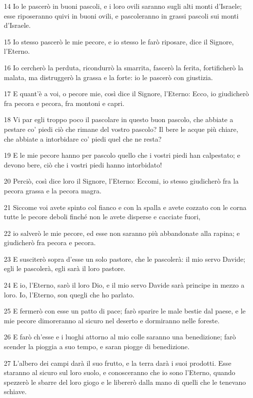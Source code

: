 \par 14 Io le pascerò in buoni pascoli, e i loro ovili saranno sugli alti monti d'Israele; esse riposeranno quivi in buoni ovili, e pascoleranno in grassi pascoli sui monti d'Israele.
\par 15 Io stesso pascerò le mie pecore, e io stesso le farò riposare, dice il Signore, l'Eterno.
\par 16 Io cercherò la perduta, ricondurrò la smarrita, fascerò la ferita, fortificherò la malata, ma distruggerò la grassa e la forte: io le pascerò con giustizia.
\par 17 E quant'è a voi, o pecore mie, così dice il Signore, l'Eterno: Ecco, io giudicherò fra pecora e pecora, fra montoni e capri.
\par 18 Vi par egli troppo poco il pascolare in questo buon pascolo, che abbiate a pestare co' piedi ciò che rimane del vostro pascolo? Il bere le acque più chiare, che abbiate a intorbidare co' piedi quel che ne resta?
\par 19 E le mie pecore hanno per pascolo quello che i vostri piedi han calpestato; e devono bere, ciò che i vostri piedi hanno intorbidato!
\par 20 Perciò, così dice loro il Signore, l'Eterno: Eccomi, io stesso giudicherò fra la pecora grassa e la pecora magra.
\par 21 Siccome voi avete spinto col fianco e con la spalla e avete cozzato con le corna tutte le pecore deboli finché non le avete disperse e cacciate fuori,
\par 22 io salverò le mie pecore, ed esse non saranno più abbandonate alla rapina; e giudicherò fra pecora e pecora.
\par 23 E susciterò sopra d'esse un solo pastore, che le pascolerà: il mio servo Davide; egli le pascolerà, egli sarà il loro pastore.
\par 24 E io, l'Eterno, sarò il loro Dio, e il mio servo Davide sarà principe in mezzo a loro. Io, l'Eterno, son quegli che ho parlato.
\par 25 E fermerò con esse un patto di pace; farò sparire le male bestie dal paese, e le mie pecore dimoreranno al sicuro nel deserto e dormiranno nelle foreste.
\par 26 E farò ch'esse e i luoghi attorno al mio colle saranno una benedizione; farò scender la pioggia a suo tempo, e saran piogge di benedizione.
\par 27 L'albero dei campi darà il suo frutto, e la terra darà i suoi prodotti. Esse staranno al sicuro sul loro suolo, e conosceranno che io sono l'Eterno, quando spezzerò le sbarre del loro giogo e le libererò dalla mano di quelli che le tenevano schiave.
